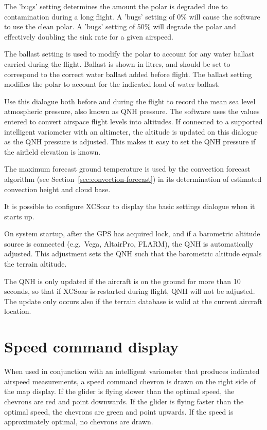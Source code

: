 The 'bugs' setting determines the amount the polar is degraded
due to contamination during a long flight.  A 'bugs' setting of 0\%
will cause the software to use the clean polar. A 'bugs' setting of
50\% will degrade the polar and effectively doubling the sink
rate for a given airspeed.

The ballast setting is used to modify the polar to account for any
water ballast carried during the flight. Ballast is shown in litres,
and should be set to correspond to the correct water ballast added
before flight.  The ballast setting modifies the polar to account for
the indicated load of water ballast.

Use this dialogue both before and during the flight to record the mean
sea level atmospheric pressure, also known as QNH pressure.  The
software uses the values entered to convert airspace flight levels
into altitudes.  If connected to a supported intelligent variometer
with an altimeter, the altitude is updated on this dialogue as the QNH
pressure is adjusted.  This makes it easy to set the QNH pressure if
the airfield elevation is known.

The maximum forecast ground temperature is used by the convection
forecast algorithm (see Section~\ref{sec:convection-forecast}) in its
determination of estimated convection height and cloud base.

\tip It is possible to configure XCSoar to display the basic
settings dialogue when it starts up.

On system startup, after the GPS has acquired lock, and if a
barometric altitude source is connected (e.g.\ Vega, AltairPro,
FLARM), the QNH is automatically adjusted.  This adjustment sets the
QNH such that the barometric altitude equals the terrain altitude.

The QNH is only updated if the aircraft is on the ground for more than
10 seconds, so that if XCSoar is restarted during flight, QNH will not
be adjusted.  The update only occurs also if the terrain database is
valid at the current aircraft location.

\section{Speed command display}

When used in conjunction with an intelligent variometer that produces
indicated airspeed measurements, a speed command chevron is drawn
on the right side of the map display.  If the glider is flying slower
than the optimal speed, the chevrons are red and point downwards.  If
the glider is flying faster than the optimal speed, the chevrons are
green and point upwards.  If the speed is approximately optimal, no
chevrons are drawn.

